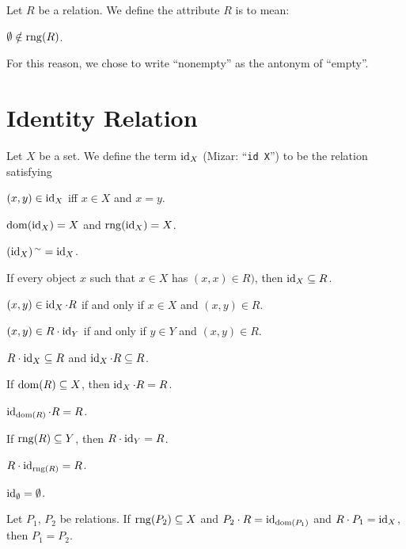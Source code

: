 \documentclass{article}
\begin{document}
\begin{definition}
Let $R$ be a relation.
We define the attribute $R$ is  to mean:
\begin{defn}
\item\label{relat1:def9}%
$\emptyset\notin\operatorname{rng}(R)$.
\end{defn}
\end{definition}

\begin{remark}
For this reason, we chose to write ``nonempty'' as the antonym of ``empty''.
\end{remark}

\section{Identity Relation}

\begin{definition}
Let $X$ be a set. We define the term $\operatorname{id}_{X}$ (Mizar: ``\verb#id X#'')
to be the relation satisfying
\begin{defn}
\item $(x,y)\in\operatorname{id}_{X}$ iff $x\in X$ and $x=y$.
\end{defn}
\end{definition}

\begin{thm}
\item\label{relat1:45} $\operatorname{dom}(\operatorname{id}_{X})=X$ and $\operatorname{rng}(\operatorname{id}_{X})=X$.
\item\label{relat1:46} $(\operatorname{id}_{X})^{\,\sim}=\operatorname{id}_{X}$.
\item\label{relat1:47} If every object $x$ such that $x\in X$ has
  $(x,x)\in R)$, then $\operatorname{id}_{X}\subseteq R$.
\item\label{relat1:48} $(x,y)\in\operatorname{id}_{X}\cdot R$ if and only if $x\in X$
  and $(x,y)\in R$.
\item\label{relat1:49} $(x,y)\in R\cdot\operatorname{id}_{Y}$ if and only if $y\in Y$
  and $(x,y)\in R$.
\item\label{relat1:50} $R\cdot\operatorname{id}_{X}\subseteq R$ and $\operatorname{id}_{X}\cdot R\subseteq R$.
\item\label{relat1:51} If $\operatorname{dom}(R)\subseteq X$, then $\operatorname{id}_{X}\cdot R=R$.
\item\label{relat1:52} $\operatorname{id}_{\operatorname{dom}(R)}\cdot R=R$.
\item\label{relat1:53} If $\operatorname{rng}(R)\subseteq Y$, then $R\cdot\operatorname{id}_{Y}=R$.
\item\label{relat1:54} $R\cdot\operatorname{id}_{\operatorname{rng}(R)}=R$.
\item\label{relat1:55} $\operatorname{id}_{\emptyset}=\emptyset$.
\item\label{relat1:56} Let $P_{1}$, $P_{2}$ be relations.
  If $\operatorname{rng}(P_{2})\subseteq X$ and $P_{2}\cdot R = \operatorname{id}_{\operatorname{dom}(P_{1})}$
  and $R\cdot P_{1}=\operatorname{id}_{X}$,
  then $P_{1}=P_{2}$.
\end{thm}
\end{document}
